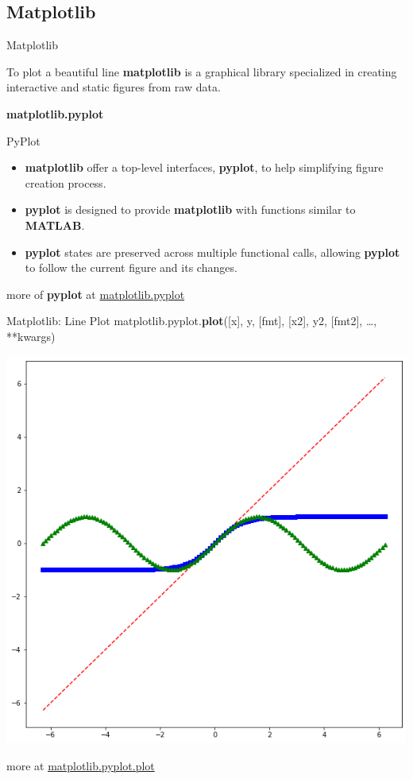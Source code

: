\documentclass{beamer}
\begin{document}
\subsection{Matplotlib}
\begin{frame}[fragile]{Matplotlib}
    \begin{block}{To plot a beautiful line}
        \textbf{matplotlib} is a graphical library specialized in creating interactive and static figures from raw data. 
    \end{block}
    \pause
    \textbf{matplotlib.pyplot}
    \begin{block}{PyPlot}
        \begin{itemize}
            \item \textbf{matplotlib} offer a top-level interfaces, \textbf{pyplot}, to help simplifying figure creation process.
            \item \textbf{pyplot} is designed to provide \textbf{matplotlib} with functions similar to \textbf{MATLAB}.
            \item \textbf{pyplot} states are preserved across multiple functional calls, allowing \textbf{pyplot} to follow the current figure and its changes.
        \end{itemize}
    \end{block}
    more of \textbf{pyplot} at \href{https://matplotlib.org/stable/api/_as_gen/matplotlib.pyplot.html}{matplotlib.pyplot}
\end{frame}
\begin{frame}[fragile]{Matplotlib: Line Plot}
    matplotlib.pyplot.\textbf{plot}([x], y, [fmt], [x2], y2, [fmt2], \dots, **kwargs)\\
    \begin{center}
        \includegraphics[width=\textwidth,height=0.6\textheight,keepaspectratio]{figures/Plot.png}\\
    \end{center}
    more at \href{https://matplotlib.org/stable/api/_as_gen/matplotlib.pyplot.plot.html}{matplotlib.pyplot.plot}
\end{frame}
\end{document}
